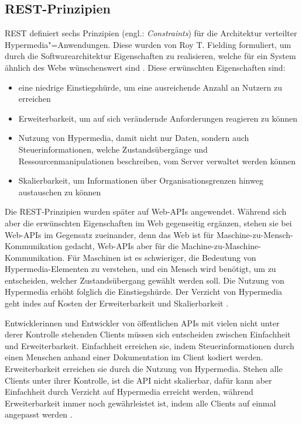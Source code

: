 \subsection{REST-Prinzipien}
REST definiert sechs Prinzipien (engl.: \textit{Constraints}) für die Architektur verteilter Hypermedia"=Anwendungen. Diese wurden von Roy T. Fielding formuliert, um durch die Softwarearchitektur Eigenschaften zu realisieren, welche für ein System ähnlich des Webs wünschenswert sind \autocite[S.~341]{Richardson2013}. Diese erwünschten Eigenschaften sind:

\begin{itemize}[noitemsep,topsep=0pt]
    \item eine niedrige Einstiegshürde, um eine ausreichende Anzahl an Nutzern zu erreichen
    \item Erweiterbarkeit, um auf sich verändernde Anforderungen reagieren zu können
    \item Nutzung von Hypermedia, damit nicht nur Daten, sondern auch Steuerinformationen, welche Zustandsübergänge und Ressourcenmanipulationen beschreiben, vom Server verwaltet werden können
    \item Skalierbarkeit, um Informationen über Organisationsgrenzen hinweg austauschen zu können \autocites[S.~66--71]{Fielding2000}[S.~342--344]{Richardson2013}
\end{itemize}
Die REST-Prinzipien wurden später auf Web-APIs angewendet. Während sich aber die erwünschten Eigenschaften im Web gegenseitig ergänzen, stehen sie bei Web-APIs im Gegensatz zueinander, denn das Web ist für Maschine-zu-Mensch-Kommunikation gedacht, Web-APIs aber für die Machine-zu-Maschine-Kommunikation. Für Maschinen ist es schwieriger, die Bedeutung von Hypermedia-Elementen zu verstehen, und ein Mensch wird benötigt, um zu entscheiden, welcher Zustandsübergang gewählt werden soll. Die Nutzung von Hypermedia erhöht folglich die Einstiegshürde. Der Verzicht von Hypermedia geht indes auf Kosten der Erweiterbarkeit und Skalierbarkeit \autocite[S.~344f.]{Richardson2013}.

Entwicklerinnen und Entwickler von öffentlichen APIs mit vielen nicht unter derer Kontrolle stehenden Clients müssen sich entscheiden zwischen Einfachheit und Erweiterbarkeit. Einfachheit erreichen sie, indem Steuerinformationen durch einen Menschen anhand einer Dokumentation im Client kodiert werden. Erweiterbarkeit erreichen sie durch die Nutzung von Hypermedia. Stehen alle Clients unter ihrer Kontrolle, ist die API nicht skalierbar, dafür kann aber Einfachheit durch Verzicht auf Hypermedia erreicht werden, während Erweiterbarkeit immer noch gewährleistet ist, indem alle Clients auf einmal angepasst werden \autocite[S.~345]{Richardson2013}.

